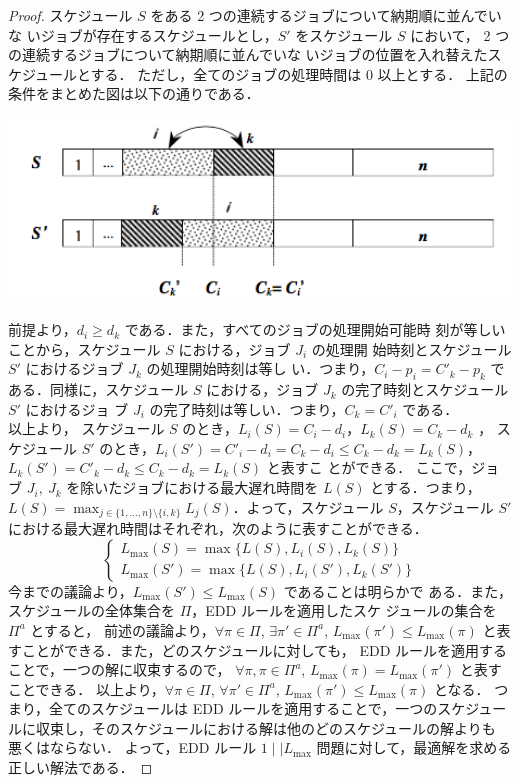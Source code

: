 \documentclass[12pt]{optlab-bachelor}
\begin{document}
  \begin{proof}
    スケジュール $S$ をある 2 つの連続するジョブについて納期順に並んでいな
    いジョブが存在するスケジュールとし，$S'$ をスケジュール $S$ において，
    2 つの連続するジョブについて納期順に並んでいな
    いジョブの位置を入れ替えたスケジュールとする．
    ただし，全てのジョブの処理時間は 0 以上とする．
    上記の条件をまとめた図は以下の通りである．
    \begin{center}
      \includegraphics[width = 15cm]{EDDrule.png}
    \end{center}
    前提より，$d_i \ge d_k$ である．また，すべてのジョブの処理開始可能時
    刻が等しいことから，スケジュール $S$ における，ジョブ $J_i$ の処理開
    始時刻とスケジュール $S'$ におけるジョブ $J_k$ の処理開始時刻は等し
    い．つまり，$C_i - p_i = C'_k - p_k$ である．同様に，スケジュール
    $S$ における，ジョブ $J_k$ の完了時刻とスケジュール $S'$ におけるジョ
    ブ $J_i$ の完了時刻は等しい．つまり，$C_k = C'_i$ である．\\
    以上より，
    スケジュール $S$ のとき，$L_i(S) = C_i - d_i$，$L_k(S) = C_k - d_k$ ，
    スケジュール $S'$ のとき，$L_i(S') = C'_i - d_i = C_k - d_i \le C_k -
    d_k = L_k(S)$，$L_k(S') = C'_k - d_k \le C_k - d_k = L_k(S)$ と表すこ
    とができる．
    ここで，ジョブ $J_i,\ J_k$ を除いたジョブにおける最大遅れ時間を $L(S)$
    とする．つまり，$L(S) = \displaystyle \max_{j \in \{1,\ldots,n\}
    \setminus \{i,k\}}L_j(S)$．よって，スケジュール $S$，スケジュール
    $S'$ における最大遅れ時間はそれぞれ，次のように表すことができる．
    $$\left\{ \begin{array}{lll} L_{\max}(S) =
    \max\{L(S),L_i(S),L_k(S)\} \\ L_{\max}(S') =
    \max\{L(S),L_i(S'),L_k(S')\}\end{array} \right.$$
    今までの議論より，$L_{\max}(S') \le L_{\max}(S)$ であることは明らかで
    ある．また，スケジュールの全体集合を $\Pi$，EDD ルールを適用したスケ
    ジュールの集合を $\Pi^a$ とすると，
    前述の議論より，$\forall \pi \in \Pi$, $\exists \pi' \in \Pi^a$, $L_{\max}(\pi') \le
    L_{\max}(\pi)$ と表すことができる．また，どのスケジュールに対しても，
    EDD ルールを適用することで，一つの解に収束するので，
    $\forall \pi, \pi \in \Pi^a$, $L_{\max}(\pi) = L_{\max}(\pi')$ と表す
    ことできる．
    以上より，$\forall \pi \in \Pi$, $\forall
    \pi' \in \Pi^a$, $L_{\max}(\pi') \le L_{\max}(\pi)$ となる．
    つまり，全てのスケジュールは EDD ルールを適用することで，一つのスケジュー
    ルに収束し，そのスケジュールにおける解は他のどのスケジュールの解よりも
    悪くはならない．
    よって，EDD ルール $1\mid \mid L_{\max}$ 問題に対して，最適解を求める
    正しい解法である．
  \end{proof}
\end{document}
